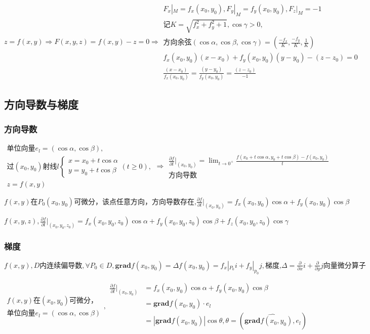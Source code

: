 \documentclass[UTF8]{ctexart}
\newcommand{\mt}[1]{\text{#1}}
\newcommand{\mb}[1]{\textbf{#1}}
\newcommand{\md}[1]{\displaystyle{#1}}
\newcommand{\mf}[1]{\left( #1\right)}
\newcommand{\mfa}[1]{\left| #1\right|}
\newcommand{\qa}{\vspace{12 pt}}
\newcommand{\p}{\par}
\newcommand{\ma}[1]{\begin{array}{llll} #1 \end{array}}
\newcommand{\da}[2]{\frac{\partial #1}{\partial #2}}
\newcommand{\fcz}[1] {
    \left\{
        \begin{array}{llll} #1 \end{array}
    \right.
}
\begin{document}
$z=f\mf{x,y}\Rightarrow F\mf{x,y,z}=f\mf{x,y}-z=0\Rightarrow \ma{
    F_x|_M=f_x\mf{x_0,y_0},F_y|_M=f_y\mf{x_0,y_0},F_z|_M=-1\\
    \mt{记}K=\sqrt{f_x^2+f_y^2+1},\cos \gamma >0,\\
    \mt{方向余弦}\mf{\cos \alpha,\cos \beta,\cos \gamma}=\mf{\frac{-f_x}{K},\frac{-f_y}{K},\frac{1}{K}}\\
    f_x\mf{x_0,y_0}\mf{x-x_0}+f_y\mf{x_0,y_0}\mf{y-y_0}-\mf{z-z_0}=0\\
    \frac{\mf{x-x_0}}{f_x\mf{x_0,y_0}}=\frac{\mf{y-y_0}}{f_y\mf{x_0,y_0}}=\frac{\mf{z-z_0}}{-1}
}$



\subsection{方向导数与梯度}

\subsubsection{方向导数}
$\ma{\mt{单位向量}e_l=\mf{\cos \alpha,\cos \beta},\\
\mt{过}\mf{x_0,y_0}\mt{射线}l \fcz{x=x_0+t\cos \alpha \\y=y_0+t\cos \beta} \mf{t\geqslant 0},\\
z=f\mf{x,y}} \Rightarrow \ma{\da{f}{l}|_{\mf{x_0,y_0}}=\md{\lim_{t \rightarrow 0^+}}\frac{f\mf{x_0+t\cos \alpha,y_0+t\cos \beta}-f\mf{x_0,y_0}}{t}\\
\mt{方向导数}}
$\p

$f\mf{x,y}\mt{在}P_0\mf{x_0,y_0}\mt{可微分，该点任意方向，方向导数存在,}\da{f}{l}|_{\mf{x_0,y_0}}=f_x\mf{x_0,y_0}\cos \alpha+f_y\mf{x_0,y_0}\cos \beta$\p
$f\mf{x,y,z},\da{f}{l}|_{\mf{x_0,y_0,z_0}}=f_x\mf{x_0,y_0,z_0}\cos \alpha+f_y\mf{x_0,y_0,z_0}\cos \beta+f_z\mf{x_0,y_0,z_0}\cos \gamma$\p



\subsubsection{梯度}
$f\mf{x,y},D\mt{内连续偏导数},\forall P_0 \in D,\mb{grad} f\mf{x_0,y_0}=\Delta f\mf{x_0,y_0}=f_x|_{P_0}i+f_y|_{p_0}j,\mt{梯度,}\Delta=\da{}{x}i+\da{}{y}j\mt{向量微分算子}$\p
\qa

$\ma{f\mf{x,y}\mt{在}\mf{x_0,y_0}\mt{可微分，}\\ \mt{单位向量}e_l=\mf{\cos \alpha,\cos \beta}},\ma{\da{f}{l}|_{\mf{x_0,y_0}}&=f_x\mf{x_0,y_0}\cos \alpha+f_y\mf{x_0,y_0}\cos \beta\\
&=\mb{grad} f\mf{x_0,y_0}\cdot e_l\\
&=\mfa{\mb{grad} f\mf{x_0,y_0}}\cos \theta, \md{\theta =\mf{\widehat{\mb{grad} f\mf{x_0,y_0},e_l}}}
}$\p
\qa
\end{document}
